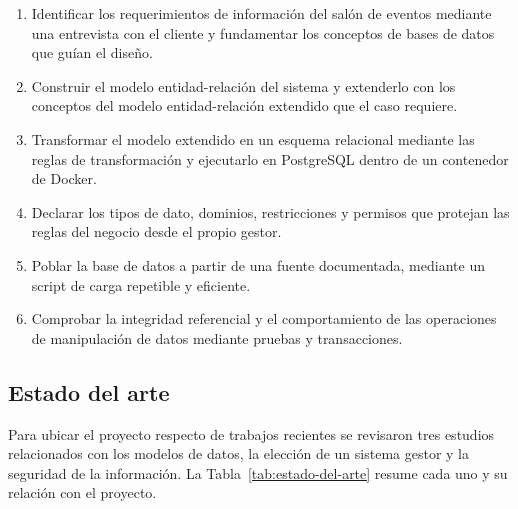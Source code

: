 \begin{enumerate}[label=\arabic*.]
    \item Identificar los requerimientos de información del salón de eventos mediante una entrevista con el cliente y fundamentar los conceptos de bases de datos que guían el diseño.
    \item Construir el modelo entidad-relación del sistema y extenderlo con los conceptos del modelo entidad-relación extendido que el caso requiere.
    \item Transformar el modelo extendido en un esquema relacional mediante las reglas de transformación y ejecutarlo en PostgreSQL dentro de un contenedor de Docker.
    \item Declarar los tipos de dato, dominios, restricciones y permisos que protejan las reglas del negocio desde el propio gestor.
    \item Poblar la base de datos a partir de una fuente documentada, mediante un script de carga repetible y eficiente.
    \item Comprobar la integridad referencial y el comportamiento de las operaciones de manipulación de datos mediante pruebas y transacciones.
\end{enumerate}

\clearpage

\subsection{Estado del arte}

Para ubicar el proyecto respecto de trabajos recientes se revisaron tres estudios relacionados con los modelos de datos, la elección de un sistema gestor y la seguridad de la información. La Tabla~\ref{tab:estado-del-arte} resume cada uno y su relación con el proyecto.

